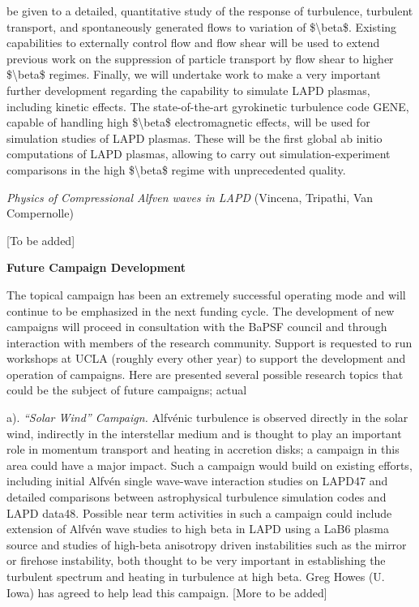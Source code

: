 \documentclass[11pt]{article}
\begin{document}
\begin{description}
be given to a detailed, quantitative study of the response of
turbulence, turbulent transport, and spontaneously generated flows to
variation of \$\textbackslash{}beta\$. Existing capabilities to
externally control flow and flow shear will be used to extend previous
work on the suppression of particle transport by flow shear to higher
\$\textbackslash{}beta\$ regimes. Finally, we will undertake work to
make a very important further development regarding the capability to
simulate LAPD plasmas, including kinetic effects. The state-of-the-art
gyrokinetic turbulence code GENE, capable of handling high
\$\textbackslash{}beta\$ electromagnetic effects, will be used for
simulation studies of LAPD plasmas. These will be the first global ab
initio computations of LAPD plasmas, allowing to carry out
simulation-experiment comparisons in the high \$\textbackslash{}beta\$
regime with unprecedented quality.

\emph{Physics of Compressional Alfven waves in LAPD} (Vincena, Tripathi,
Van Compernolle)

{[}To be added{]}


\textbf{Future Campaign Development}

The topical campaign has been an extremely successful operating mode and
will continue to be emphasized in the next funding cycle. The
development of new campaigns will proceed in consultation with the BaPSF
council and through interaction with members of the research community.
Support is requested to run workshops at UCLA (roughly every other year)
to support the development and operation of campaigns. Here are
presented several possible research topics that could be the subject of
future campaigns; actual

a). \emph{``Solar Wind'' Campaign.} Alfvénic turbulence is observed
directly in the solar wind, indirectly in the interstellar medium and is
thought to play an important role in momentum transport and heating in
accretion disks; a campaign in this area could have a major impact. Such
a campaign would build on existing efforts, including initial Alfvén
single wave-wave interaction studies on LAPD47 and detailed comparisons
between astrophysical turbulence simulation codes and LAPD data48.
Possible near term activities in such a campaign could include extension
of Alfvén wave studies to high beta in LAPD using a LaB6 plasma source
and studies of high-beta anisotropy driven instabilities such as the
mirror or firehose instability, both thought to be very important in
establishing the turbulent spectrum and heating in turbulence at high
beta. Greg Howes (U. Iowa) has agreed to help lead this campaign.
{[}More to be added{]}


\end{description}
\end{document}
